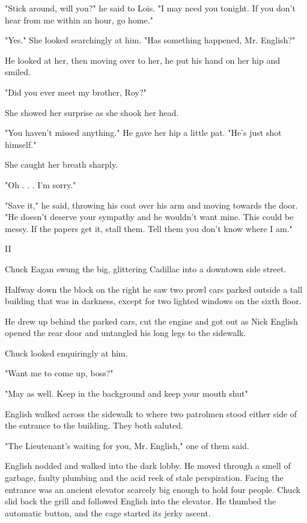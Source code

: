 \documentclass{novel}
\begin{document}
"Stick around, will you?" he said to Lois. "I may need you tonight. If you don't hear from me within an hour, go home."

"Yes." She looked searchingly at him. "Has something happened, Mr. English?"

He looked at her, then moving over to her, he put his hand on her hip and smiled.

"Did you ever meet my brother, Roy?"

She showed her surprise as she shook her head.

"You haven't missed anything." He gave her hip a little pat. "He's just shot himself."

She caught her breath sharply.

"Oh . . . I'm sorry."

"Save it," he said, throwing his coat over his arm and moving towards the door. "He doesn't deserve your sympathy and he wouldn't want mine. This could be messy. If the papers get it, stall them. Tell them you don't know where I am."



II

Chuck Eagan swung the big, glittering Cadillac into a downtown side street.

Halfway down the block on the right he saw two prowl cars parked outside a tall building that was in darkness, except for two lighted windows on the sixth floor.

He drew up behind the parked cars, cut the engine and got out as Nick English opened the rear door and untangled his long legs to the sidewalk.

Chuck looked enquiringly at him.

"Want me to come up, boss?"

"May as well. Keep in the background and keep your mouth shut"

English walked across the sidewalk to where two patrolmen stood either side of the entrance to the building. They both saluted.

"The Lieutenant's waiting for you, Mr. English," one of them said.

English nodded and walked into the dark lobby. He moved through a smell of garbage, faulty plumbing and the acid reek of stale perspiration. Facing the entrance was an ancient elevator scarcely big enough to hold four people. Chuck slid back the grill and followed English into the elevator. He thumbed the automatic button, and the cage started its jerky ascent.
\end{document}
